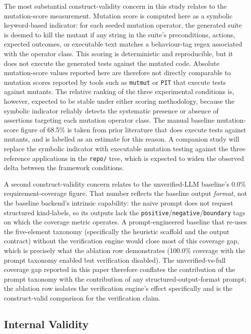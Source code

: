 \documentclass[conference]{IEEEtran}
\begin{document}
The most substantial construct-validity concern in this study relates to the mutation-score measurement. Mutation score is computed here as a symbolic keyword-based indicator: for each seeded mutation operator, the generated suite is deemed to kill the mutant if any string in the suite's preconditions, actions, expected outcomes, or executable text matches a behaviour-tag regex associated with the operator class. This scoring is deterministic and reproducible, but it does not execute the generated tests against the mutated code. Absolute mutation-score values reported here are therefore not directly comparable to mutation scores reported by tools such as \texttt{mutmut} or \texttt{PIT} that execute tests against mutants. The relative ranking of the three experimental conditions is, however, expected to be stable under either scoring methodology, because the symbolic indicator reliably detects the systematic presence or absence of assertions targeting each mutation operator class. The manual baseline mutation-score figure of 68.5\% is taken from prior literature that does execute tests against mutants, and is labelled as an estimate for this reason. A companion study will replace the symbolic indicator with executable mutation testing against the three reference applications in the \texttt{repo/} tree, which is expected to widen the observed delta between the framework conditions.

A second construct-validity concern relates to the unverified-LLM baseline's 0.0\% requirement-coverage figure. That number reflects the baseline output \emph{format}, not the baseline backend's intrinsic capability: the naive prompt does not request structured kind-labels, so its outputs lack the \texttt{positive}/\texttt{negative}/\texttt{boundary} tags on which the coverage metric operates. A prompt-engineered baseline that re-uses the five-element taxonomy (specifically the heuristic scaffold and the output contract) without the verification engine would close most of this coverage gap, which is precisely what the ablation row demonstrates (100.0\% coverage with the prompt taxonomy enabled but verification disabled). The unverified-vs-full coverage gap reported in this paper therefore conflates the contribution of the prompt taxonomy with the contribution of any structured-output-format prompt; the ablation row isolates the verification engine's effect specifically and is the construct-valid comparison for the verification claim.

\subsection{Internal Validity}
\end{document}
